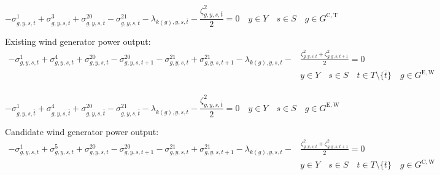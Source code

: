 \documentclass{article}
\newcommand{\sGeneratorsExistingWind}{G^{\mathrm{E,W}}}
\newcommand{\sGeneratorsCandidateThermal}{G^{\mathrm{C,T}}}
\newcommand{\sGeneratorsCandidateWind}{G^{\mathrm{C,W}}}
\newcommand{\sYears}{Y}
\newcommand{\sScenarios}{S}
\newcommand{\sIntervals}{T}
\newcommand{\iGenerator}{g}
\newcommand{\iYear}{y}
\newcommand{\iScenario}{s}
\newcommand{\iInterval}{t}
\newcommand{\iIntervalTerminal}{\overline{\iInterval}}
\newcommand{\iZone}{z}
\newcommand{\dMinPowerOutput}[1][\iGenerator,\iYear,\iScenario,\iInterval]{\sigma_{#1}^{1}}
\newcommand{\dMaxPowerOutputCandidateThermal}[1][\iGenerator,\iYear,\iScenario,\iInterval]{\sigma_{#1}^{3}}
\newcommand{\dMaxPowerOutputWindExisting}[1][\iGenerator,\iYear,\iScenario,\iInterval]{\sigma_{#1}^{4}}
\newcommand{\dMaxPowerOutputWindCandidate}[1][\iGenerator,\iYear,\iScenario,\iInterval]{\sigma_{#1}^{5}}
\newcommand{\dRampRateUp}[1][\iGenerator,\iYear,\iScenario,\iInterval]{\sigma_{#1}^{20}}
\newcommand{\dRampRateDown}[1][\iGenerator,\iYear,\iScenario,\iInterval]{\sigma_{#1}^{21}}
\newcommand{\dPowerBalance}[1][\iZone,\iYear,\iScenario,\iInterval]{\lambda_{#1}}
\newcommand{\dGeneratorEnergyOutput}[1][\iGenerator,\iYear,\iScenario,\iInterval]{\zeta_{#1}^{2}}
\begin{document}
\begin{equation}
-\dMinPowerOutput[\iGenerator,\iYear,\iScenario,\iIntervalTerminal] + \dMaxPowerOutputCandidateThermal[\iGenerator,\iYear,\iScenario,\iIntervalTerminal] + \dRampRateUp[\iGenerator,\iYear,\iScenario,\iIntervalTerminal] - \dRampRateDown[\iGenerator,\iYear,\iScenario,\iIntervalTerminal] - \dPowerBalance[k(\iGenerator),\iYear,\iScenario,\iIntervalTerminal] - \frac{\dGeneratorEnergyOutput[\iGenerator,\iYear,\iScenario,\iIntervalTerminal]}{2} = 0 \quad \iYear \in \sYears \quad \iScenario \in \sScenarios \quad \iGenerator \in \sGeneratorsCandidateThermal
\end{equation}

Existing wind generator power output:
\begin{align}
-\dMinPowerOutput + \dMaxPowerOutputWindExisting + \dRampRateUp - \dRampRateUp[\iGenerator,\iYear,\iScenario,\iInterval+1] - \dRampRateDown + \dRampRateDown[\iGenerator,\iYear,\iScenario,\iInterval+1] - \dPowerBalance[k(\iGenerator),\iYear,\iScenario,\iInterval] - & \frac{\dGeneratorEnergyOutput + \dGeneratorEnergyOutput[\iGenerator,\iYear,\iScenario,\iInterval+1]}{2} = 0 \\\nonumber
& \iYear \in \sYears \quad \iScenario \in \sScenarios \quad \iInterval \in \sIntervals \setminus \{\iIntervalTerminal\} \quad \iGenerator \in \sGeneratorsExistingWind\\\nonumber
\end{align}

\begin{equation}
 -\dMinPowerOutput[\iGenerator,\iYear,\iScenario,\iIntervalTerminal] + \dMaxPowerOutputWindExisting[\iGenerator,\iYear,\iScenario,\iIntervalTerminal] + \dRampRateUp[\iGenerator,\iYear,\iScenario,\iIntervalTerminal] - \dRampRateDown[\iGenerator,\iYear,\iScenario,\iIntervalTerminal] - \dPowerBalance[k(\iGenerator),\iYear,\iScenario,\iIntervalTerminal] - \frac{\dGeneratorEnergyOutput[\iGenerator,\iYear,\iScenario,\iIntervalTerminal]}{2} = 0 \quad \iYear \in \sYears \quad \iScenario \in \sScenarios \quad \iGenerator \in \sGeneratorsExistingWind
\end{equation}

Candidate wind generator power output:
\begin{align}
-\dMinPowerOutput + \dMaxPowerOutputWindCandidate + \dRampRateUp - \dRampRateUp[\iGenerator,\iYear,\iScenario,\iInterval+1] - \dRampRateDown + \dRampRateDown[\iGenerator,\iYear,\iScenario,\iInterval+1] - \dPowerBalance[k(\iGenerator),\iYear,\iScenario,\iInterval] - & \frac{\dGeneratorEnergyOutput + \dGeneratorEnergyOutput[\iGenerator,\iYear,\iScenario,\iInterval+1]}{2} = 0 \\\nonumber
& \iYear \in \sYears \quad \iScenario \in \sScenarios \quad \iInterval \in \sIntervals \setminus \{\iIntervalTerminal\} \quad \iGenerator \in \sGeneratorsCandidateWind\\\nonumber
\end{align}
\end{document}
